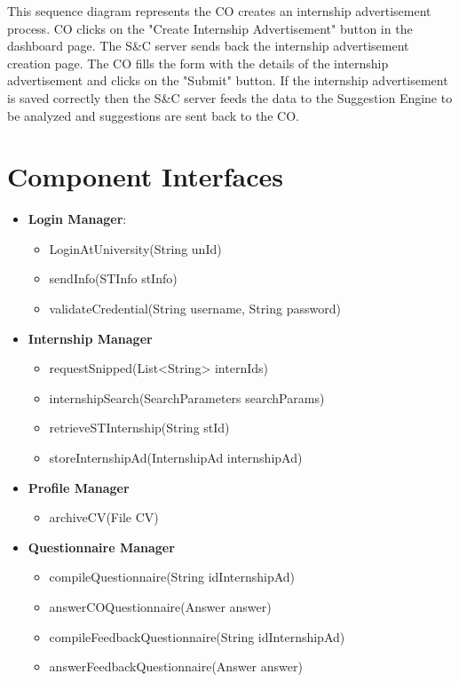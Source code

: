 \par This sequence diagram represents the CO creates an internship advertisement process. CO clicks on the "Create Internship
Advertisement" button in the dashboard page. The S\&C server sends back the internship advertisement creation page. The CO fills
the form with the details of the internship advertisement and clicks on the "Submit" button. If the internship advertisement is
saved correctly then the S\&C server feeds the data to the Suggestion Engine to be analyzed and suggestions are sent back to the CO.

\section{Component Interfaces}
\label{sec:component-interfaces}%


\begin{itemize}
      \item \textbf{Login Manager}:
          \begin{itemize}
              \item LoginAtUniversity(String unId)
              \item sendInfo(STInfo stInfo)
              \item validateCredential(String username, String password)
          \end{itemize}
  
      \item \textbf{Internship Manager}
          \begin{itemize}
              \item requestSnipped(List<String> internIds)
              \item internshipSearch(SearchParameters searchParams)
              \item retrieveSTInternship(String stId)
              \item storeInternshipAd(InternshipAd internshipAd)
          \end{itemize}
  
      \item \textbf{Profile Manager}
          \begin{itemize}
              \item archiveCV(File CV)
          \end{itemize}
      
      \item \textbf{Questionnaire Manager}
          \begin{itemize}
              \item compileQuestionnaire(String idInternshipAd)
              \item answerCOQuestionnaire(Answer answer)
              \item compileFeedbackQuestionnaire(String idInternshipAd)
              \item answerFeedbackQuestionnaire(Answer answer)
          \end{itemize}
  

\end{itemize}

